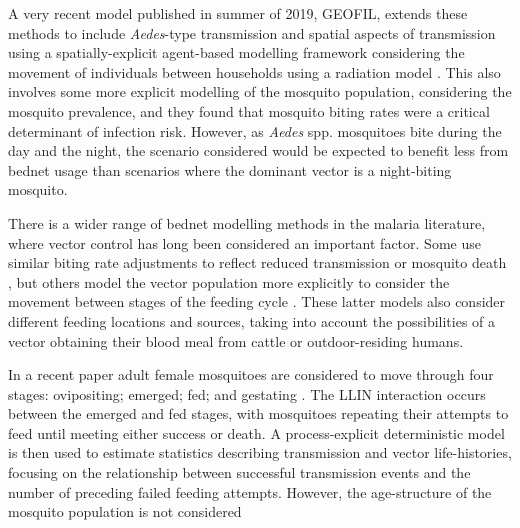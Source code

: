 A very recent model published in summer of 2019, GEOFIL, extends these methods to include \textit{Aedes}-type transmission and spatial aspects of transmission using a spatially-explicit agent-based modelling framework considering the movement of individuals between households using a radiation model \cite{Xu2019}. This also involves some more explicit modelling of the mosquito population, considering the mosquito prevalence, and they found that mosquito biting rates were a critical determinant of infection risk. However, as \textit{Aedes} spp. mosquitoes bite during the day and the night, the scenario considered would be expected to benefit less from bednet usage than scenarios where the dominant vector is a night-biting  mosquito.

There is a wider range of bednet modelling methods in the malaria literature, where vector control has long been considered an important factor. Some use similar biting rate adjustments to reflect reduced transmission or mosquito death \cite{griffin2010}, but others model the vector population more explicitly to consider the movement between stages of the feeding cycle \cite{killeen2016,le2007}. These latter models also consider different feeding locations and sources, taking into account the possibilities of a vector obtaining their blood meal from cattle or outdoor-residing humans.

In a recent paper adult female mosquitoes are considered to move through four stages: ovipositing; emerged; fed; and gestating \cite{killeen2016}. The LLIN interaction occurs between the emerged and fed stages, with mosquitoes repeating their attempts to feed until meeting either success or death. A process-explicit deterministic model is then used to estimate statistics describing transmission and vector life-histories, focusing on the relationship between successful transmission events and the number of preceding failed feeding attempts. However, the age-structure of the mosquito population is not considered

